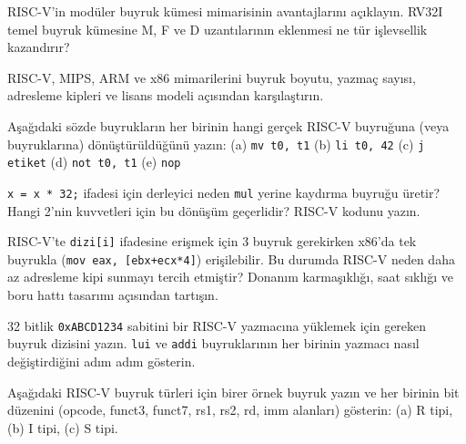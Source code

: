 \begin{alistirma}[\orta]
RISC-V'in modüler buyruk kümesi mimarisinin avantajlarını açıklayın. RV32I temel buyruk kümesine M, F ve D uzantılarının eklenmesi ne tür işlevsellik kazandırır?
\end{alistirma}

\begin{alistirma}[\zor]
RISC-V, MIPS, ARM ve x86 mimarilerini buyruk boyutu, yazmaç sayısı, adresleme kipleri ve lisans modeli açısından karşılaştırın.
\end{alistirma}

\begin{alistirma}[\kolay]
Aşağıdaki sözde buyrukların her birinin hangi gerçek RISC-V buyruğuna (veya buyruklarına) dönüştürüldüğünü yazın: (a) \texttt{mv t0, t1} \quad (b) \texttt{li t0, 42} \quad (c) \texttt{j etiket} \quad (d) \texttt{not t0, t1} \quad (e) \texttt{nop}
\end{alistirma}

\begin{alistirma}[\orta]
\texttt{x = x * 32;} ifadesi için derleyici neden \texttt{mul} yerine kaydırma buyruğu üretir? Hangi 2'nin kuvvetleri için bu dönüşüm geçerlidir? RISC-V kodunu yazın.
\end{alistirma}

\begin{alistirma}[\orta]
RISC-V'te \texttt{dizi[i]} ifadesine erişmek için 3 buyruk gerekirken x86'da tek buyrukla (\texttt{mov eax, [ebx+ecx*4]}) erişilebilir. Bu durumda RISC-V neden daha az adresleme kipi sunmayı tercih etmiştir? Donanım karmaşıklığı, saat sıklığı ve boru hattı tasarımı açısından tartışın.
\end{alistirma}

\begin{alistirma}[\orta]
32 bitlik \texttt{0xABCD1234} sabitini bir RISC-V yazmacına yüklemek için gereken buyruk dizisini yazın. \texttt{lui} ve \texttt{addi} buyruklarının her birinin yazmacı nasıl değiştirdiğini adım adım gösterin.
\end{alistirma}


\begin{alistirma}[\orta]
Aşağıdaki RISC-V buyruk türleri için birer örnek buyruk yazın ve her birinin bit düzenini (opcode, funct3, funct7, rs1, rs2, rd, imm alanları) gösterin: (a) R tipi, (b) I tipi, (c) S tipi.
\end{alistirma}

